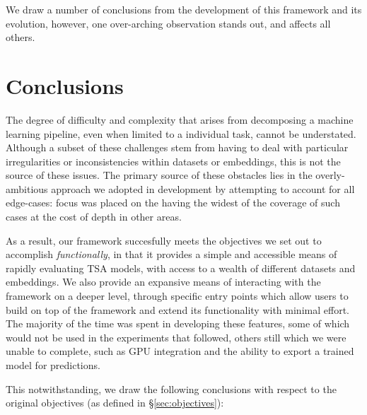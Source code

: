 \documentclass[../../fyp.tex]{subfiles}
\begin{document}
We draw a number of conclusions from the development of this framework and its evolution, however, one over-arching observation stands out, and affects all others. 

\section{Conclusions}
The degree of difficulty and complexity that arises from decomposing a machine learning pipeline, even when limited to a individual task, cannot be understated. Although a subset of these challenges stem from having to deal with particular irregularities or inconsistencies within datasets or embeddings, this is not the source of these issues. The primary source of these obstacles lies in the overly-ambitious approach we adopted in development by attempting to account for all edge-cases: focus was placed on the having the widest of the coverage of such cases at the cost of depth in other areas. 

As a result, our framework succesfully meets the objectives we set out to accomplish \textit{functionally}, in that it provides a simple and accessible means of rapidly evaluating TSA models, with access to a wealth of different datasets and embeddings. We also provide an expansive means of interacting with the framework on a deeper level, through specific entry points which allow users to build on top of the framework and extend its functionality with minimal effort. The majority of the time was spent in developing these features, some of which would not be used in the experiments that followed, others still which we were unable to complete, such as GPU integration and the ability to export a trained model for predictions.

This notwithstanding, we draw the following conclusions with respect to the original objectives (as defined in \S\ref{sec:objectives}):
\end{document}
